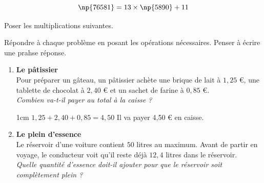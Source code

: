 \documentclass[a4paper]{book}
\begin{document}
{\begin{exercice}
\begin{minipage}{0.33\linewidth}
            \[\np{76581}=13 \times \np{5890} +11\]
        \end{minipage}            
    \end{exercice}


    \begin{exercice}
        Poser les multiplications suivantes.

        \medskip

        \begin{minipage}{0.33\linewidth}
            \quad {}

  
        \end{minipage}
        \hfill\vline\hfill
        \begin{minipage}{0.33\linewidth}
            \quad {}

        \end{minipage}        
        \hfill\vline\hfill
        \begin{minipage}{0.33\linewidth}
            \quad {}
            
        \end{minipage}
    \end{exercice}


    \begin{exercice}
        Répondre à chaque problème en posant les opérations nécessaires. Penser à écrire une prahse réponse.
        
        \begin{enumerate}

            \item \textbf{Le pâtissier} \\
            Pour préparer un gâteau, un pâtissier achète une brique de lait à $1,25$ €, une tablette de chocolat à $2,40$ € et un sachet de farine à $0,85$ €. \\
            \textit{Combien va-t-il payer au total à la caisse ?}
            
            \begin{ZoneReponse}{1cm}
                $1,25+2,40+0,85=4,50$ \hspace{2cm}  Il va payer 4,50 € en caisse.
            \end{ZoneReponse}

\newpage
        
            \item \textbf{Le plein d'essence} \\
            Le réservoir d'une voiture contient $50$ litres au maximum. Avant de partir en voyage, le conducteur voit qu'il reste déjà $12,4$ litres dans le réservoir. \\
            \textit{Quelle quantité d'essence doit-il ajouter pour que le réservoir soit complètement plein ?}


\end{enumerate}
\end{exercice}}
\end{document}
